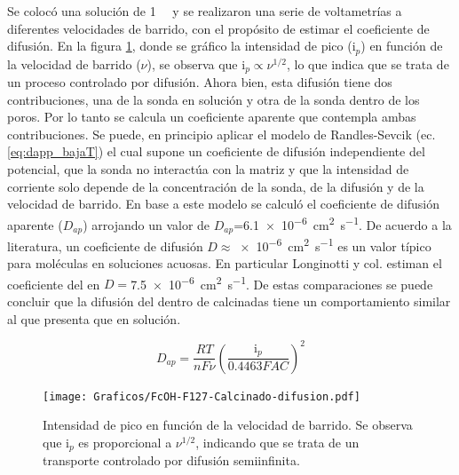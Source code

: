 	 Se colocó una solución de \fc\space \SI{1}{\milli\Molar} y se realizaron una serie de voltametrías a diferentes velocidades de barrido, con el propósito de estimar el coeficiente de difusión. En la figura \ref{fig:difusion_calcinado}, donde se gráfico la intensidad de pico (i$_p$) en función de la velocidad de barrido ($\nu$), se observa que $\text{i}_p \propto \nu^{1/2}$, lo que indica que se trata de un proceso controlado por difusión. Ahora bien, esta difusión tiene dos contribuciones, una de la sonda en solución y otra de la sonda dentro de los poros. Por lo tanto se calcula un coeficiente aparente que contempla ambas contribuciones. Se puede, en principio aplicar el modelo de Randles-Sevcik (ec. \ref{eq:dapp_bajaT}) el cual supone un coeficiente de difusión independiente del potencial, que la sonda no interactúa con la matriz y que la intensidad de corriente solo depende de la concentración de la sonda, de la difusión y de la velocidad de barrido. En base a este modelo se calculó el coeficiente de difusión aparente ($D_{ap}$) arrojando un valor de $D_{ap}$=\SI{6,1e-6}{\square\cm\per\second}. De acuerdo a la literatura, un coeficiente de difusión $D\approx$\SI{e-6}{\square\cm\per\second} es un valor típico para moléculas en soluciones acuosas. \cite{koryta1993,Otal2006} En particular Longinotti y col.\cite{longinotti2007} estiman el coeficiente del \fc\space en $D=$\SI{7,5e-6}{\square\cm\per\second}. De estas comparaciones se puede concluir que la difusión del \fc\space dentro de \pdmF\space calcinadas tiene un comportamiento similar al que presenta que en solución.


		 \begin{equation}
					D_{ap}=\frac{RT}{nF\nu}\left(\frac{\text{i}_p}{0.4463FAC}\right)^2
					\label{eq:dapp_bajaT}
			\end{equation}  
	 

		    \begin{figure}[ht!]
				\centering
		 	    \texttt{[image: Graficos/FcOH-F127-Calcinado-difusion.pdf]}
		        \caption[i$_p$ en función de $\nu$ para \fc\space]{Intensidad de pico en función de la velocidad de barrido. Se observa que $\text{i}_p$ es proporcional a $\nu ^{1/2}$, indicando que se trata de un transporte controlado por difusión semiinfinita.}
		        \label{fig:difusion_calcinado}
		      	\end{figure}
	      	
